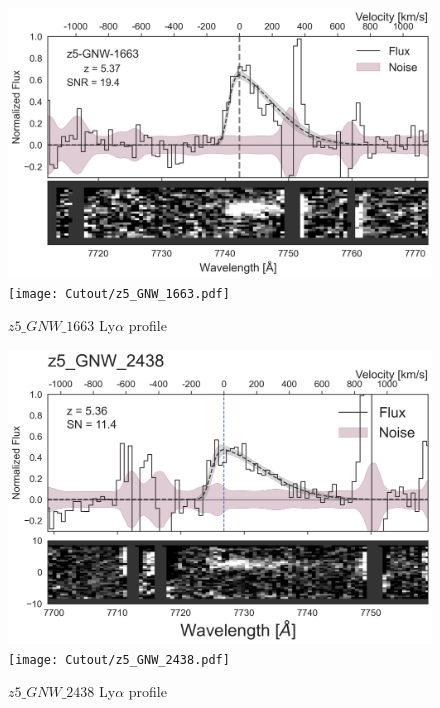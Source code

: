 \documentclass[12pt,english]{article}
\begin{document}
\clearpage
\begin{figure}
\begin{center}\includegraphics[width=12cm, trim=0.1cm 0cm 0cm -1cm]{LyaProfiles/z5_GNW_1663.png}
\texttt{[image: Cutout/z5\_GNW\_1663.pdf]}
\caption{$z5\_GNW\_1663$ Ly$\alpha$ profile}
\end{center}
\end{figure}
\clearpage
\begin{figure}
\begin{center}\includegraphics[width=12cm, trim=0.1cm 0cm 0cm -1cm]{LyaProfiles/z5_GNW_2438.png}
\texttt{[image: Cutout/z5\_GNW\_2438.pdf]}
\caption{$z5\_GNW\_2438$ Ly$\alpha$ profile}
\end{center}
\end{figure}
\clearpage
\end{document}
